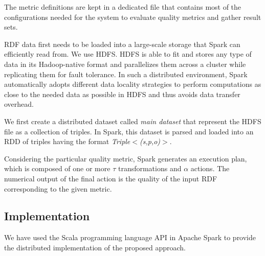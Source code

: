  The metric definitions are kept in a dedicated file that contains most of the configurations needed for the system to evaluate quality metrics and gather result sets.

 \gls{RDF} data first needs to be loaded into a large-scale storage that Spark can efficiently read from.
We use \gls{HDFS}.
\gls{HDFS} is able to fit and stores any type of data in its Hadoop-native format and parallelizes them across a cluster while replicating them for fault tolerance.
In such a distributed environment, Spark automatically adopts different data locality strategies to perform computations as close to the needed data as possible in \gls{HDFS} and thus avoids data transfer overhead.
 
 We first create a distributed dataset called \emph{main dataset} that represent the \gls{HDFS} file as a collection of triples.
In Spark, this dataset is parsed and loaded into an \gls{RDD} of triples having the format 
\emph{Triple$<$(s,p,o)$>$}.

 Considering the particular quality metric, Spark generates an execution plan, which is composed of one or more $\tau$ transformations and $\alpha$ actions. 
The numerical output of the final action is the quality of the input \gls{RDF} corresponding to the given metric.

\subsection{Implementation}
\label{subsection:distqualityassessment-implementation}
We have used the Scala programming language \gls{API} in Apache Spark to provide the distributed implementation of the proposed approach. 

